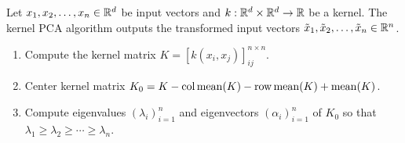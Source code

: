 
Let \(x_1, x_2, \dots, x_n \in \mathbb{R}^d\) be input vectors and \(k : \mathbb{R}^d \times \mathbb{R}^d \to \mathbb{R}\) be a kernel.
The kernel PCA algorithm outputs the transformed input vectors \(\tilde{x}_1, \tilde{x}_2, \dots, \tilde{x}_n \in \mathbb{R}^n\).
\begin{enumerate}
    \item Compute the kernel matrix \(K = [k(x_i, x_j)]_{ij}^{n \times n}\).
    \item Center kernel matrix \(K_0 = K - \operatorname{col\,mean}(K) - \operatorname{row\,mean}(K) + \operatorname{mean}(K)\).
    \item Compute eigenvalues \((\lambda_i)_{i=1}^n\) and eigenvectors \((\alpha_i)_{i=1}^n\) of \(K_0\) so that \(\lambda_1 \geq \lambda_2 \geq \cdots \geq \lambda_n\).
\end{enumerate}


